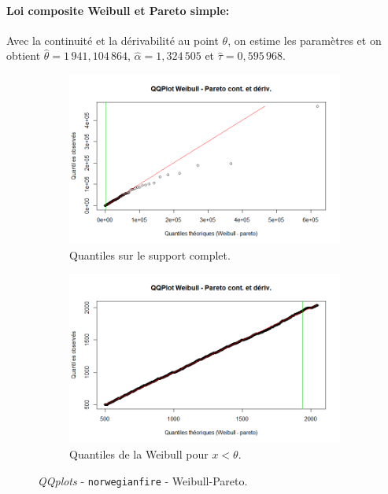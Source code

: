 		\paragraph{Loi composite Weibull et Pareto simple:} Avec la continuité et la dérivabilité au point $\theta$, on estime les paramètres et on obtient $\hat{\theta} = 1\,941,104\,864$, $\hat{\alpha} = 1,324\,505$ et $\hat{\tau}=0,595\,968$.
		
		\begin{figure}[H]
			\begin{center}
				\begin{subfigure}[b]{0.45\textwidth}
					\includegraphics[scale=0.40]{Graphiques/QQ_Wei_Pa_contderiv} 
					\caption{Quantiles sur le support complet.} \label{QQplot_W_Pa_conde}
				\end{subfigure}
				\begin{subfigure}[b]{0.40\textwidth}
					\includegraphics[scale=0.40]{Graphiques/QQ_Wei_Pa_contderiv_t1} 
					\caption{Quantiles de la Weibull pour $x<\theta$.} \label{QQplot_W_Pa_conde_2}
				\end{subfigure}
				\renewcommand{\figurename}{Illustration}
				\caption{\textit{QQplots} - \texttt{norwegianfire} - Weibull-Pareto.}
			\end{center}
		\end{figure}
		
